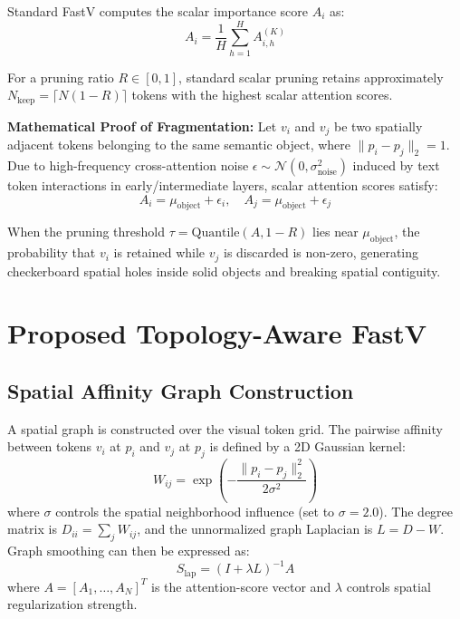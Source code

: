 \documentclass[conference]{IEEEtran}
\begin{document}
Standard FastV computes the scalar importance score $A_i$ as:
\begin{equation}
A_i = \frac{1}{H} \sum_{h=1}^H A_{i, h}^{(K)}
\end{equation}

For a pruning ratio $R \in [0, 1]$, standard scalar pruning retains approximately $N_{\text{keep}} = \lceil N(1 - R) \rceil$ tokens with the highest scalar attention scores.

\textbf{Mathematical Proof of Fragmentation:}  
Let $v_i$ and $v_j$ be two spatially adjacent tokens belonging to the same semantic object, where $\|p_i - p_j\|_2 = 1$. Due to high-frequency cross-attention noise $\epsilon \sim \mathcal{N}(0, \sigma_{\text{noise}}^2)$ induced by text token interactions in early/intermediate layers, scalar attention scores satisfy:
\begin{equation}
A_i = \mu_{\text{object}} + \epsilon_i, \quad A_j = \mu_{\text{object}} + \epsilon_j
\end{equation}

When the pruning threshold $\tau = \text{Quantile}(A, 1 - R)$ lies near $\mu_{\text{object}}$, the probability that $v_i$ is retained while $v_j$ is discarded is non-zero, generating checkerboard spatial holes inside solid objects and breaking spatial contiguity.

\section{Proposed Topology-Aware FastV}
\subsection{Spatial Affinity Graph Construction}
A spatial graph is constructed over the visual token grid. The pairwise affinity between tokens $v_i$ at $p_i$ and $v_j$ at $p_j$ is defined by a 2D Gaussian kernel:
\begin{equation}
W_{ij} = \exp\left( -\frac{\|p_i - p_j\|_2^2}{2\sigma^2} \right)
\end{equation}
where $\sigma$ controls the spatial neighborhood influence (set to $\sigma = 2.0$).
The degree matrix is $D_{ii} = \sum_{j} W_{ij}$, and the unnormalized graph Laplacian is $L = D - W$. Graph smoothing can then be expressed as:
\begin{equation}
S_{\text{lap}} = (I + \lambda L)^{-1} A
\end{equation}
where $A = [A_1, \dots, A_N]^T$ is the attention-score vector and $\lambda$ controls spatial regularization strength.
\end{document}
